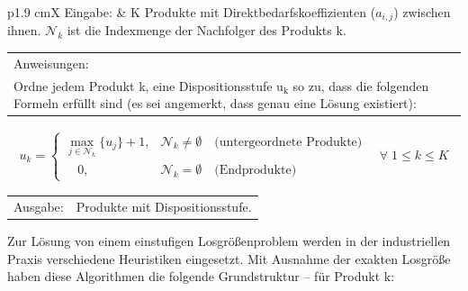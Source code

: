 \documentclass[13pt,a4paper, listof=entryprefix, bibliography=totocnumbered,toc=listofnumbered,lof=listofnumbered]{scrartcl}
\begin{document}
\begin{algorithmic}
	\label{algo:Algorithmus_Dispositionsstufen}
	\STATE
	\begin{tabularx}{\linewidth}{p{1.9 cm}X}
		Eingabe: & K Produkte mit Direktbedarfskoeffizienten ($a_{i,j}$) zwischen ihnen. $\mathcal{N}_{k}$ ist die Indexmenge der Nachfolger des Produkts k.
	\end{tabularx}
	\addtocounter{table}{-1} %
	\begin{tabularx}{\linewidth}{X}
		Anweisungen: \\
		Ordne jedem Produkt k, eine Dispositionsstufe $\mathrm{u_{k}}$ so zu, dass die folgenden Formeln erfüllt sind (es sei angemerkt, dass genau eine Lösung existiert):
	\end{tabularx}
	\addtocounter{table}{-1} %
	\vspace{-1,0cm}
	\begin{fleqn}[0,5cm]
		\begin{align*}
			u_{k} = \begin{cases}	 \max\limits_{j \in \mathcal{N}_{k}}  \{u_{j}\}+1,
				                 & \mathcal{N}_{k} \ne \emptyset
				        \quad \text{(untergeordnete Produkte)}                              \\
				        \quad 0, & \mathcal{N}_{k}   = \emptyset \quad \text{(Endprodukte)}
			        \end{cases} \quad \forall\; 1 \le k \le K
		\end{align*}
	\end{fleqn}
	\begin{tabularx}{\linewidth}{p{1.9 cm}X}
		\hspace*{1 mm} Ausgabe: & Produkte mit Dispositionsstufe.
	\end{tabularx}
	\addtocounter{table}{-1} %
\end{algorithmic}

\vspace{\baselineskip}

Zur Lösung von einem einstufigen Losgrößenproblem werden in der industriellen Praxis verschiedene Heuristiken eingesetzt. Mit Ausnahme der exakten Losgröße haben diese Algorithmen die folgende Grundstruktur -- für Produkt k: \\
\end{document}

